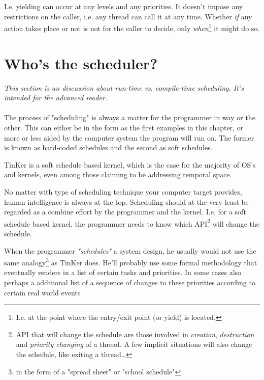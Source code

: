 	I.e. yielding can occur at any levels and any priorities. It doesn't impose any restrictions on the caller, i.e. any thread can call it at any time. Whether \textit{if} any action takes place or not is not for the caller to decide, only \textit{when}\footnote{I.e. at the point where the entry/exit point (or yield) is located.} it might do so.
	

\section{Who's the scheduler?}
\textit{This section is an discussion about run-time vs. compile-time scheduling. It's intended for the advanced reader.}
\\\\
The process of "scheduling" is always a matter for the programmer in way or the other. This can either be in the form as the first examples in this chapter, or more or less aided by the computer system the program will run on. The former is known as hard-coded schedules and the second as soft schedules. 

TinKer is a soft schedule based kernel, which is the case for the majority of OS's and kernels, even among those claiming to be addressing temporal space. 

No matter with type of scheduling technique your computer target provides, human intelligence is always at the top. Scheduling should at the very least be regarded as a combine effort by the programmer and the kernel. I.e. for a soft schedule based kernel, the programmer needs to know which API\footnote{API that will change the schedule are those involved in \textit{creation}, \textit{destruction} and \textit{priority changing} of a thread. A few implicit situations will also change the schedule, like exiting a thread\ldots} will change the schedule.


When the programmer \textit{"schedules"} a system design, he usually would not use the same analogy\footnote{in the form of a "spread sheet" or "school schedule"\textit{}} as TinKer does. He'll probably use some formal methodology that eventually renders in a list of certain tasks and priorities. In some cases also perhaps a additional list of a sequence of changes to these priorities according to certain real world events 

